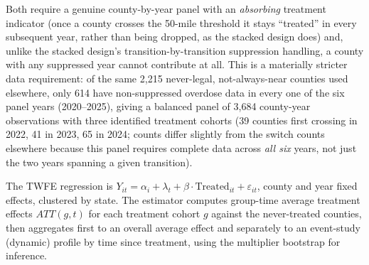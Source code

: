\documentclass[preprint,12pt,authoryear]{elsarticle}
\begin{document}
Both require a genuine county-by-year panel with an \emph{absorbing}
treatment indicator (once a county crosses the 50-mile threshold it
stays ``treated'' in every subsequent year, rather than being dropped,
as the stacked design does) and, unlike the stacked design's
transition-by-transition suppression handling, a county with any
suppressed year cannot contribute at all. This is a materially
stricter data requirement: of the same 2,215 never-legal, not-always-near
counties used elsewhere, only 614 have non-suppressed overdose data in
every one of the six panel years (2020--2025), giving a balanced panel
of 3,684 county-year observations with three identified treatment
cohorts (39 counties first crossing in 2022, 41 in 2023, 65 in 2024;
counts differ slightly from the switch counts elsewhere because this
panel requires complete data across \emph{all six} years, not just the
two years spanning a given transition).

The TWFE regression is $Y_{it} = \alpha_i + \lambda_t + \beta \cdot
\text{Treated}_{it} + \varepsilon_{it}$, county and year fixed effects,
clustered by state. The \citet{CallawaySantAnna2021} estimator computes
group-time average treatment effects $ATT(g,t)$ for each treatment
cohort $g$ against the never-treated counties, then aggregates first to
an overall average effect and separately to an event-study (dynamic)
profile by time since treatment, using the multiplier bootstrap for
inference.
\end{document}

